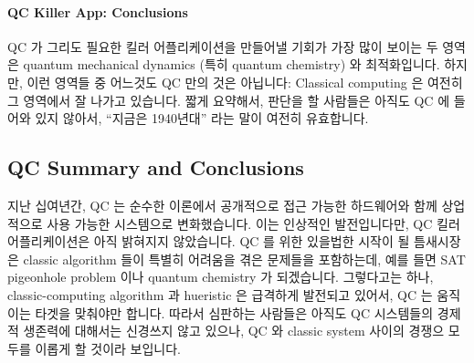 \paragraph{QC Killer App: Conclusions}
\label{sec:future:QC Killer App: Conclusions}

QC 가 그리도 필요한 킬러 어플리케이션을 만들어낼 기회가 가장 많이 보이는 두
영역은 quantum mechanical dynamics (특히 quantum chemistry) 와 최적화입니다.
하지만, 이런 영역들 중 어느것도 QC 만의 것은 아닙니다: Classical computing 은
여전히 그 영역에서 잘 나가고 있습니다.
짧게 요약해서, 판단을 할 사람들은 아직도 QC 에 들어와 있지 않아서, ``지금은
1940년대'' 라는 말이 여전히 유효합니다.

\subsection{QC Summary and Conclusions}
\label{sec:future:QC Summary and Conclusions}

지난 십여년간, QC 는 순수한 이론에서 공개적으로 접근 가능한 하드웨어와 함께
상업적으로 사용 가능한 시스템으로 변화했습니다.
이는 인상적인 발전입니다만, QC 킬러 어플리케이션은 아직 밝혀지지 않았습니다.
QC 를 위한 있을법한 시작이 될 틈새시장은 classic algorithm 들이 특별히 어려움을
겪은 문제들을 포함하는데, 예를 들면 SAT pigeonhole problem 이나 quantum
chemistry 가 되겠습니다.  그렇다고는 하나, classic-computing algorithm 과
hueristic 은 급격하게 발전되고 있어서, QC 는 움직이는 타겟을 맞춰야만 합니다.
따라서 심판하는 사람들은 아직도 QC 시스템들의 경제적 생존력에 대해서는 신경쓰지
않고 있으나, QC 와 classic system 사이의 경쟁으 모두를 이롭게 할 것이라
보입니다.

